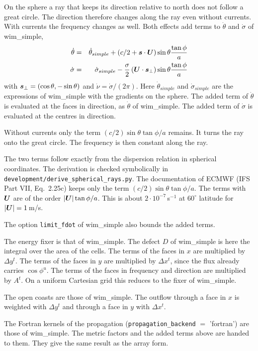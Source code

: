 \documentclass[12pt]{article}
\newcommand{\beq}  { \begin{eqnarray} }
\newcommand{\eeq}  { \end{eqnarray}}
\renewcommand{\v}[1]{{\mbox{\boldmath$ #1 $}}}  %
\newcommand{\lk}{\left(}
\newcommand{\rk}{\right)}
\begin{document}
On the sphere a ray that keeps its direction relative to north does not follow a great circle.
The direction therefore changes along the ray even without currents.
With currents the frequency changes as well.
Both effects add terms to $\dot \theta$ and $\dot \sigma$ of wim\_simple,
\beq
 \dot \theta &=& \dot \theta_{simple} + \lk c/2 + \v s \cdot \v U \rk \sin \theta \frac{\tan \phi}{a} \\
 \dot \sigma &=& \dot \sigma_{simple} - \frac{\sigma}{2} \lk \v U \cdot \v s_\perp \rk \sin \theta \frac{\tan \phi}{a}
\eeq
with $\v s_\perp = (\cos \theta, -\sin \theta)$ and $\dot \nu = \dot \sigma /(2 \pi)$.
Here $\dot \theta_{simple}$ and $\dot \sigma_{simple}$ are the expressions of wim\_simple with the gradients on the sphere.
The added term of $\dot \theta$ is evaluated at the faces in direction, as $\dot \theta$ of wim\_simple.
The added term of $\dot \sigma$ is evaluated at the centres in direction.

Without currents only the term $(c/2) \sin \theta \tan \phi /a$ remains.
It turns the ray onto the great circle.
The frequency is then constant along the ray.

The two terms follow exactly from the dispersion relation in spherical coordinates.
The derivation is checked symbolically in \verb|development/derive_spherical_rays.py|.
The documentation of ECMWF (IFS Part VII, Eq.\ 2.25c) keeps only the term $(c/2) \sin \theta \tan \phi/a$.
The terms with $\v U$ are of the order $|\v U| \tan \phi /a$.
This is about $2 \cdot 10^{-7}\,$s$^{-1}$ at $60^\circ$ latitude for $|\v U| = 1\,$m/s.

The option \verb|limit_fdot| of wim\_simple also bounds the added terms.

The energy fixer is that of wim\_simple.
The defect $D$ of wim\_simple is here the integral over the area of the cells.
The terms of the faces in $x$ are multiplied by $\Delta y^t$.
The terms of the faces in $y$ are multiplied by $\Delta x^t$, since the flux already carries $\cos \phi^u$.
The terms of the faces in frequency and direction are multiplied by $A^t$.
On a uniform Cartesian grid this reduces to the fixer of wim\_simple.

The open coasts are those of wim\_simple.
The outflow through a face in $x$ is weighted with $\Delta y^t$ and through a face in $y$ with $\Delta x^t$.

The Fortran kernels of the propagation (\verb|propagation_backend| $=$ 'fortran') are those of wim\_simple.
The metric factors and the added terms above are handed to them.
They give the same result as the array form.
\end{document}
